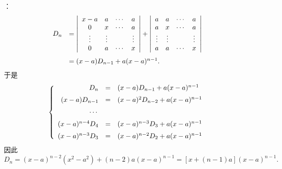 \begin{frame}

：
  $$
  \begin{array}{ll}
    D_n &  = \left|
          \begin{array}{cccc}
            x-a  & a  & \cdots & a   \\
            0    & x  & \cdots & a   \\
            \vdots  &\vdots &     & \vdots \\
            0    & a  & \cdots & x 
          \end{array}
                              \right|
                              +\left|
                              \begin{array}{cccc}
                                a   & a  & \cdots & a   \\
                                a   & x  & \cdots & a   \\
                                \vdots &\vdots &     & \vdots \\
                                a   & a  & \cdots & x 
                              \end{array}
                                                 \right| \\[1.0cm]
        & = (x-a) D_{n-1} + a(x-a)^{n-1}.
  \end{array}
  $$ 
  于是
  $$
  \left\{
    \begin{array}{rcl}
      D_n           &=& (x-a)D_{n-1} + a(x-a)^{n-1} \\[0.2cm]
      (x-a)D_{n-1}      &=& (x-a)^2D_{n-2} + a(x-a)^{n-1} \\[0.2cm]
      \cdots           && \\ [0.2cm]
      (x-a)^{n-4}D_4 &=& (x-a)^{n-3}D_{3} + a(x-a)^{n-1}\\ [0.2cm]
      (x-a)^{n-3}D_3 &=& (x-a)^{n-2}D_{2} + a(x-a)^{n-1}
    \end{array}
  \right.
  $$ 
  因此
  $$
  D_n = (x-a)^{n-2}(x^2-a^2) + (n-2)a(x-a)^{n-1} = [x+(n-1)a](x-a)^{n-1}.      
  $$
 
\end{frame}

